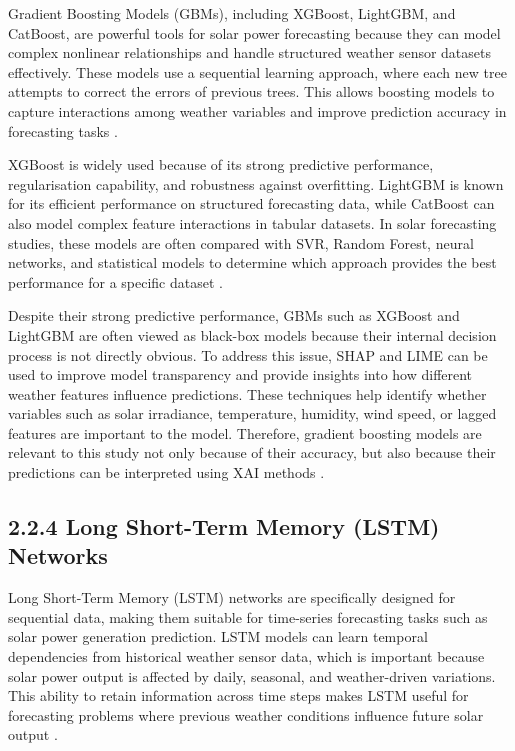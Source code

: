 Gradient Boosting Models (GBMs), including XGBoost, LightGBM, and CatBoost, are powerful tools for solar power forecasting because they can model complex nonlinear relationships and handle structured weather sensor datasets effectively. These models use a sequential learning approach, where each new tree attempts to correct the errors of previous trees. This allows boosting models to capture interactions among weather variables and improve prediction accuracy in forecasting tasks \parencite{JnanaVarshitha2025, Bakht2025, Alhassan2025}.

XGBoost is widely used because of its strong predictive performance, regularisation capability, and robustness against overfitting. LightGBM is known for its efficient performance on structured forecasting data, while CatBoost can also model complex feature interactions in tabular datasets. In solar forecasting studies, these models are often compared with SVR, Random Forest, neural networks, and statistical models to determine which approach provides the best performance for a specific dataset \parencite{JnanaVarshitha2025, Bakht2025, Alhassan2025, CarvalhoJunior2025}.

Despite their strong predictive performance, GBMs such as XGBoost and LightGBM are often viewed as black-box models because their internal decision process is not directly obvious. To address this issue, SHAP and LIME can be used to improve model transparency and provide insights into how different weather features influence predictions. These techniques help identify whether variables such as solar irradiance, temperature, humidity, wind speed, or lagged features are important to the model. Therefore, gradient boosting models are relevant to this study not only because of their accuracy, but also because their predictions can be interpreted using XAI methods \parencite{JnanaVarshitha2025, TsaiLo2025, Pongphaw2025, Bakht2025}.

\subsection{2.2.4 Long Short-Term Memory (LSTM) Networks}

Long Short-Term Memory (LSTM) networks are specifically designed for sequential data, making them suitable for time-series forecasting tasks such as solar power generation prediction. LSTM models can learn temporal dependencies from historical weather sensor data, which is important because solar power output is affected by daily, seasonal, and weather-driven variations. This ability to retain information across time steps makes LSTM useful for forecasting problems where previous weather conditions influence future solar output \parencite{Eren2025, TsaiLo2025, Duvuru2026}.

